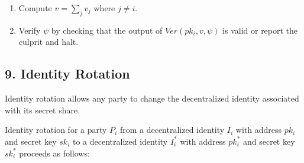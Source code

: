 \documentclass[
]{article}
\providecommand{\tightlist}{%
  \setlength{\itemsep}{0pt}\setlength{\parskip}{0pt}}
\begin{document}
\begin{enumerate}
\def\labelenumi{\arabic{enumi}.}
\tightlist
\item
  Compute \(v = \sum _j v_j\) where \(j \neq i\).
\item
  Verify \(\psi\) by checking that the output of \(Ver(pk_i, v, \psi)\)
  is valid or report the culprit and halt.
\end{enumerate}

\hypertarget{identity-rotation}{%
\subsection{9. Identity Rotation}\label{identity-rotation}}

Identity rotation allows any party to change the decentralized identity
associated with its secret share.

Identity rotation for a party \(P_i\) from a decentralized identity
\(I_i\) with address \(pk_i\) and secret key \(sk_i\) to a decentralized
identity \(I_i^ \ast\) with address \(pk_i^ \ast\) and secret key
\(sk_i^ \ast\) proceeds as follows:
\end{document}
